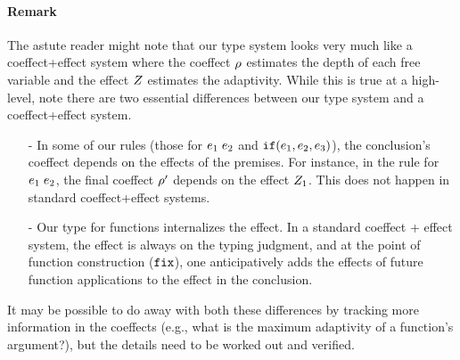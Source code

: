 \documentclass[a4paper,11pt]{article}
\theoremstyle{definition}
\begin{document}
\paragraph{Remark}
The astute reader might note that our type system looks very much like
a coeffect+effect system where the coeffect $\rho$ estimates the
depth of each free variable and the effect $Z$ estimates the
adaptivity. While this is true at a high-level, note there are two
essential differences between our type system and a coeffect+effect
system.
\begin{itemize}
\item[-] In some of our rules (those for $e_1 \; e_2$ and
  $\mathtt{if}(e_1, e_2, e_3)$), the conclusion's coeffect
  depends on the effects of the premises. For instance, in the rule
  for $e_1 \; e_2$, the final coeffect $\rho'$ depends on
  the effect $Z_1$. This does not happen in standard
  coeffect+effect systems.
\item[-] Our type for functions internalizes the effect. In a standard
  coeffect + effect system, the effect is always on the typing
  judgment, and at the point of function construction ($\mathop{\mathtt{fix}}$), one
  anticipatively adds the effects of future function applications to
  the effect in the conclusion.
\end{itemize}
It may be possible to do away with both these differences by tracking
more information in the coeffects (e.g., what is the maximum
adaptivity of a function's argument?), but the details need to be
worked out and verified.
\end{document}
